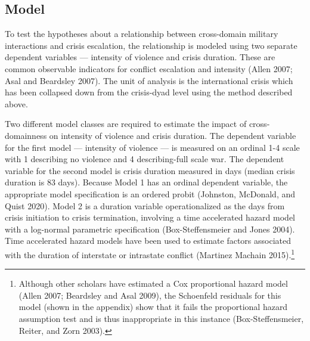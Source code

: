 \documentclass[
]{article}
\begin{document}
\hypertarget{model}{%
\subsection{Model}\label{model}}

To test the hypotheses about a relationship between cross-domain military interactions and crisis escalation, the relationship is modeled using two separate dependent variables --- intensity of violence and crisis duration. These are common observable indicators for conflict escalation and intensity (Allen 2007; Asal and Beardsley 2007). The unit of analysis is the international crisis which has been collapsed down from the crisis-dyad level using the method described above.

Two different model classes are required to estimate the impact of cross-domainness on intensity of violence and crisis duration. The dependent variable for the first model --- intensity of violence --- is measured on an ordinal 1-4 scale with 1 describing no violence and 4 describing-full scale war. The dependent variable for the second model is crisis duration measured in days (median crisis duration is 83 days). Because Model 1 has an ordinal dependent variable, the appropriate model specification is an ordered probit (Johnston, McDonald, and Quist 2020). Model 2 is a duration variable operationalized as the days from crisis initiation to crisis termination, involving a time accelerated hazard model with a log-normal parametric specification (Box-Steffensmeier and Jones 2004). Time accelerated hazard models have been used to estimate factors associated with the duration of interstate or intrastate conflict (Martinez Machain 2015).\footnote{Although other scholars have estimated a Cox proportional hazard model (Allen 2007; Beardsley and Asal 2009), the Schoenfeld residuals for this model (shown in the appendix) show that it fails the proportional hazard assumption test and is thus inappropriate in this instance (Box-Steffensmeier, Reiter, and Zorn 2003).}
\end{document}
